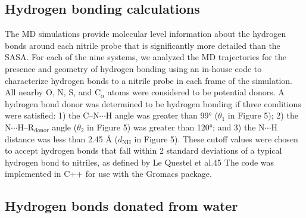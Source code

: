 \subsection{Hydrogen bonding calculations}

The MD simulations provide molecular level information about the hydrogen bonds around each nitrile probe that is significantly more detailed than the SASA.
For each of the nine systems, we analyzed the MD trajectories for the presence and geometry of hydrogen bonding using an in-house code to characterize hydrogen bonds to a nitrile probe in each frame of the simulation.
All nearby O, N, S, and C$_{\alpha}$ atoms were considered to be potential donors.
A hydrogen bond donor was determined to be hydrogen bonding if three conditions were satisfied: 1) the C--N$\cdots$H angle was greater than \ang{99} ($\theta_1$ in Figure 5); 2) the N$\cdots$H--R$_{\text{donor}}$ angle ($\theta_2$ in Figure 5) was greater than \ang{120}; and 3) the N$\cdots$H distance was less than 2.45 \si{\angstrom} ($d_{\text{NH}}$ in Figure 5).
These cutoff values were chosen to accept hydrogen bonds that fall within 2 standard deviations of a typical hydrogen bond to nitriles, as defined by Le Questel et al.45
The code was implemented in C++ for use with the Gromacs package.  

\subsection{Hydrogen bonds donated from water}

